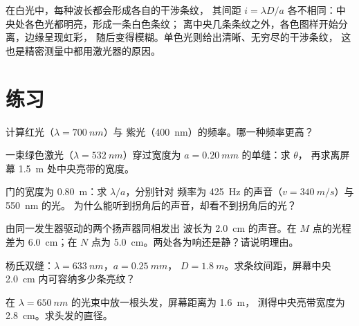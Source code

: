 \begin{remark}[单色光与白光]\label{rem:g12:light-as-wave:white}
在白光中，每种波长都会形成各自的干涉条纹，
其间距 $i = \lambda D/a$ 各不相同：中央处各色光都明亮，形成一条白色条纹；
离中央几条条纹之外，各色图样开始分离，边缘呈现虹彩，
随后变得模糊。单色光则给出清晰、无穷尽的干涉条纹，
这也是精密测量中都用激光器的原因。
\end{remark}

\section{练习}

\begin{exercise}[$\star$]\label{exo:g12:light-as-wave:1}
计算红光（$\lambda = \qty{700}{nm}$）与
紫光（\qty{400}{nm}）的频率。哪一种频率更高？
\end{exercise}

\begin{exercise}[$\star$]\label{exo:g12:light-as-wave:2}
一束绿色激光（$\lambda = \qty{532}{nm}$）穿过宽度为
$a = \qty{0.20}{mm}$ 的单缝：求 $\theta$，
再求离屏幕 \qty{1.5}{m} 处中央亮带的宽度。
\end{exercise}

\begin{exercise}[$\star$]\label{exo:g12:light-as-wave:3}
门的宽度为 \qty{0.80}{m}：求 $\lambda/a$，分别针对
频率为 \qty{425}{Hz} 的声音（$v = \qty{340}{m/s}$）与 \qty{550}{nm} 的光。
为什么能听到拐角后的声音，却看不到拐角后的光？
\end{exercise}

\begin{exercise}[$\star$]\label{exo:g12:light-as-wave:4}
由同一发生器驱动的两个扬声器同相发出
波长为 \qty{2.0}{cm} 的声音。在 $M$ 点的光程差为 \qty{6.0}{cm}；在
$N$ 点为 \qty{5.0}{cm}。两处各为响还是静？请说明理由。
\end{exercise}

\begin{exercise}[$\star$]\label{exo:g12:light-as-wave:5}
杨氏双缝：$\lambda = \qty{633}{nm}$，$a = \qty{0.25}{mm}$，
$D = \qty{1.8}{m}$。求条纹间距，屏幕中央
\qty{2.0}{cm} 内可容纳多少条亮纹？
\end{exercise}

\begin{exercise}[$\star\star$]\label{exo:g12:light-as-wave:6}
在 $\lambda = \qty{650}{nm}$ 的光束中放一根头发，屏幕距离为 \qty{1.6}{m}，
测得中央亮带宽度为 \qty{2.8}{cm}。求头发的直径。
\end{exercise}


